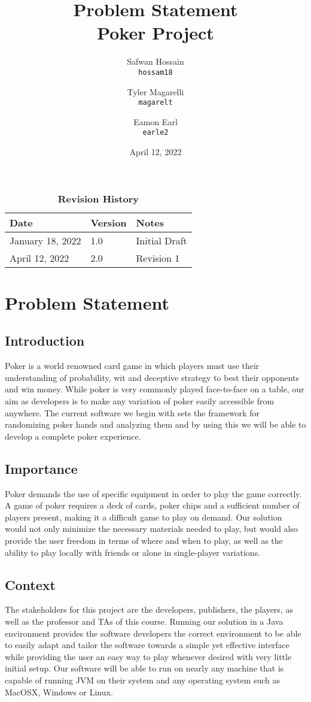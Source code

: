 \documentclass{article}
\title{Problem Statement \\ Poker Project}
\author{
  Safwan Hossain\\
  \texttt{hossam18}\\
  \and
  Tyler Magarelli\\
  \texttt{magarelt}\\
  \and
  Eamon Earl\\
  \texttt{earle2}
}
\date{April 12, 2022}
\begin{document}
\maketitle
\newpage

\begin{table}[bp]
\caption{\bf Revision History}
\begin{tabularx}{\textwidth}{p{3cm}p{2cm}X}
\toprule {\bf Date} & {\bf Version} & {\bf Notes}\\
\midrule
January 18, 2022 & 1.0 & Initial Draft\\
April 12, 2022 & 2.0 & Revision 1\\
\bottomrule
\end{tabularx}
\end{table}

\section*{Problem Statement}
\subsection*{Introduction}
    Poker is a world renowned card game in which players must use their understanding of probability, wit and deceptive strategy to best their opponents and win money. While poker is very commonly played face-to-face on a table, our aim as developers is to make any variation of poker easily accessible from anywhere. The current software we begin with sets the framework for randomizing poker hands and analyzing them and by using this we will be able to develop a complete poker experience.
\subsection*{Importance}
    Poker demands the use of specific equipment in order to play the game correctly. A game of poker requires a deck of cards, poker chips and a sufficient number of players present, making it a difficult game to play on demand. Our solution would not only minimize the necessary materials needed to play, but would also provide the user freedom in terms of where and when to play, as well as the ability to play locally with friends or alone in single-player variations.

\subsection*{Context}
    The stakeholders for this project are the developers, publishers, the players, as well as the professor and TAs of this course. Running our solution in a Java environment provides the software developers the correct environment to be able to easily adapt and tailor the software towards a simple yet effective interface while providing the user an easy way to play whenever desired with very little initial setup. Our software will be able to run on nearly any machine that is capable of running JVM on their system and any operating system such as MacOSX, Windows or Linux.
\end{document}

